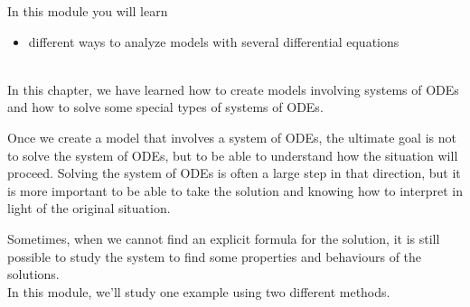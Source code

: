 In this module you will learn
\begin{itemize}
	\item different ways to analyze models with several differential equations
\end{itemize}

\hfill \\



In this chapter, we have learned how to create models involving systems of ODEs and how to solve some special types of systems of ODEs.

Once we create a model that involves a system of ODEs, the ultimate goal is not to solve the system of ODEs, but to be able to understand how the situation will proceed.
Solving the system of ODEs is often a large step in that direction, but it is more important to be able to take the solution and knowing how to interpret in light of the original situation.

Sometimes, when we cannot find an explicit formula for the solution, it is still possible to study the system to find some properties and behaviours of the solutions. \\

In this module, we'll study one example using two different methods.


